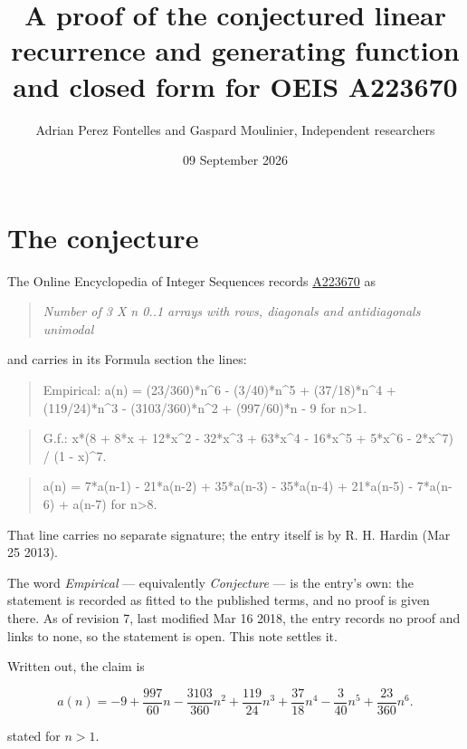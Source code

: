 \documentclass[11pt]{article}
\title{A proof of the conjectured linear recurrence and generating function and closed form for OEIS A223670}
\author{Adrian Perez Fontelles and Gaspard Moulinier, Independent researchers}
\date{09 September 2026}
\theoremstyle{definition}
\begin{document}
\maketitle
\section{The conjecture}

The Online Encyclopedia of Integer Sequences records \href{https://oeis.org/A223670}{A223670} as

\begin{quote}\itshape Number of 3 X n 0..1 arrays with rows, diagonals and antidiagonals unimodal\end{quote}

and carries in its Formula section the lines:

\begin{quote}\ttfamily Empirical: a(n) = (23/360)*n\textasciicircum{}6 - (3/40)*n\textasciicircum{}5 + (37/18)*n\textasciicircum{}4 + (119/24)*n\textasciicircum{}3 - (3103/360)*n\textasciicircum{}2 + (997/60)*n - 9 for n>1.\end{quote}

\begin{quote}\ttfamily G.f.: x*(8 + 8*x + 12*x\textasciicircum{}2 - 32*x\textasciicircum{}3 + 63*x\textasciicircum{}4 - 16*x\textasciicircum{}5 + 5*x\textasciicircum{}6 - 2*x\textasciicircum{}7) / (1 - x)\textasciicircum{}7.\end{quote}

\begin{quote}\ttfamily a(n) = 7*a(n-1) - 21*a(n-2) + 35*a(n-3) - 35*a(n-4) + 21*a(n-5) - 7*a(n-6) + a(n-7) for n>8.\end{quote}

That line carries no separate signature; the entry itself is by R. H. Hardin (Mar 25 2013).

The word {\itshape Empirical} --- equivalently {\itshape Conjecture} --- is the entry's own: the statement is recorded as fitted to the published terms, and no proof is given there. As of revision 7, last modified Mar 16 2018, the entry records no proof and links to none, so the statement is open. This note settles it.

Written out, the claim is

\[a(n) = -9 + \frac{997}{60}n - \frac{3103}{360}n^{2} + \frac{119}{24}n^{3} + \frac{37}{18}n^{4} - \frac{3}{40}n^{5} + \frac{23}{360}n^{6}.\]

stated for $n > 1$.
\end{document}
